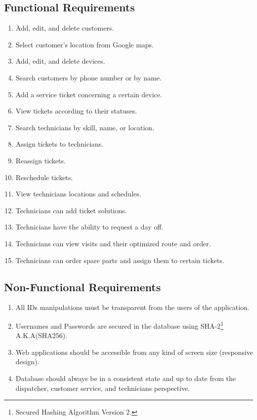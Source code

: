 \subsection{Functional Requirements}
	\begin{enumerate}
		\item Add, edit, and delete customers.
		\item Select customer's location from Google maps.
		\item Add, edit, and delete devices.
		\item Search customers by phone number or by name.
		\item Add a service ticket concerning a certain device.
		\item View tickets according to their statuses.
		\item Search technicians by skill, name, or location.
		\item Assign tickets to technicians.
		\item Reassign tickets.
		\item Reschedule tickets.
		\item View technicians locations and schedules.
		\item Technicians can add ticket solutions.
		\item Technicians have the ability to request a day off.
		\item Technicians can view visits and their optimized route and order.
		\item Technicians can order spare parts and assign them to certain tickets.
	\end{enumerate}
\subsection{Non-Functional Requirements}
	\begin{enumerate}
		\item All IDs manipulations must be transparent from the users of the application.
		\item Usernames and Passwords are secured in the database using SHA-2\footnote{Secured Hashing Algorithm Version 2.} A.K.A(SHA256).
		\item Web applications should be accessible from any kind of screen size (responsive design).
		\item Database should always be in a consistent state and up to date from the dispatcher, customer service, and technicians perspective.
	\end{enumerate}